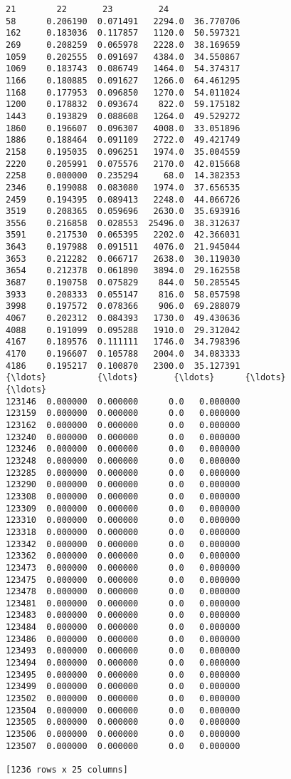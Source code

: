 \documentclass[11pt]{article}
\begin{document}
\begin{Verbatim}[commandchars=\\\{\}]
              21        22       23         24  
58      0.206190  0.071491   2294.0  36.770706  
162     0.183036  0.117857   1120.0  50.597321  
269     0.208259  0.065978   2228.0  38.169659  
1059    0.202555  0.091697   4384.0  34.550867  
1069    0.183743  0.086749   1464.0  54.374317  
1166    0.180885  0.091627   1266.0  64.461295  
1168    0.177953  0.096850   1270.0  54.011024  
1200    0.178832  0.093674    822.0  59.175182  
1443    0.193829  0.088608   1264.0  49.529272  
1860    0.196607  0.096307   4008.0  33.051896  
1886    0.188464  0.091109   2722.0  49.421749  
2158    0.195035  0.096251   1974.0  35.004559  
2220    0.205991  0.075576   2170.0  42.015668  
2258    0.000000  0.235294     68.0  14.382353  
2346    0.199088  0.083080   1974.0  37.656535  
2459    0.194395  0.089413   2248.0  44.066726  
3519    0.208365  0.059696   2630.0  35.693916  
3556    0.216858  0.028553  25496.0  38.312637  
3591    0.217530  0.065395   2202.0  42.366031  
3643    0.197988  0.091511   4076.0  21.945044  
3653    0.212282  0.066717   2638.0  30.119030  
3654    0.212378  0.061890   3894.0  29.162558  
3687    0.190758  0.075829    844.0  50.285545  
3933    0.208333  0.055147    816.0  58.057598  
3998    0.197572  0.078366    906.0  69.288079  
4067    0.202312  0.084393   1730.0  49.430636  
4088    0.191099  0.095288   1910.0  29.312042  
4167    0.189576  0.111111   1746.0  34.798396  
4170    0.196607  0.105788   2004.0  34.083333  
4186    0.195217  0.100870   2300.0  35.127391  
{\ldots}          {\ldots}       {\ldots}      {\ldots}        {\ldots}  
123146  0.000000  0.000000      0.0   0.000000  
123159  0.000000  0.000000      0.0   0.000000  
123162  0.000000  0.000000      0.0   0.000000  
123240  0.000000  0.000000      0.0   0.000000  
123246  0.000000  0.000000      0.0   0.000000  
123248  0.000000  0.000000      0.0   0.000000  
123285  0.000000  0.000000      0.0   0.000000  
123290  0.000000  0.000000      0.0   0.000000  
123308  0.000000  0.000000      0.0   0.000000  
123309  0.000000  0.000000      0.0   0.000000  
123310  0.000000  0.000000      0.0   0.000000  
123318  0.000000  0.000000      0.0   0.000000  
123342  0.000000  0.000000      0.0   0.000000  
123362  0.000000  0.000000      0.0   0.000000  
123473  0.000000  0.000000      0.0   0.000000  
123475  0.000000  0.000000      0.0   0.000000  
123478  0.000000  0.000000      0.0   0.000000  
123481  0.000000  0.000000      0.0   0.000000  
123483  0.000000  0.000000      0.0   0.000000  
123484  0.000000  0.000000      0.0   0.000000  
123486  0.000000  0.000000      0.0   0.000000  
123493  0.000000  0.000000      0.0   0.000000  
123494  0.000000  0.000000      0.0   0.000000  
123495  0.000000  0.000000      0.0   0.000000  
123499  0.000000  0.000000      0.0   0.000000  
123502  0.000000  0.000000      0.0   0.000000  
123504  0.000000  0.000000      0.0   0.000000  
123505  0.000000  0.000000      0.0   0.000000  
123506  0.000000  0.000000      0.0   0.000000  
123507  0.000000  0.000000      0.0   0.000000  

[1236 rows x 25 columns]

    \end{Verbatim}


    
    
    
    
\end{document}
